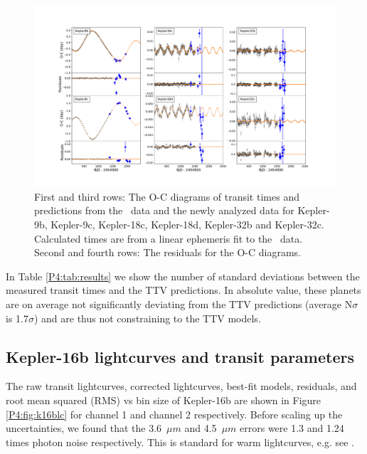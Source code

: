 \begin{figure}
    \centering
    \includegraphics[trim=110 70 110 90, clip, width = \textwidth]{TTVs.pdf}
    \caption{First and third rows: The O-C diagrams of transit times and predictions from the \Kepler~data and the newly analyzed \spitzer data for Kepler-9b, Kepler-9c, Kepler-18c, Kepler-18d, Kepler-32b and Kepler-32c. Calculated times are from a linear ephemeris fit to the \Kepler~data. Second and fourth rows: The residuals for the O-C diagrams.}
    \label{P4:fig:TTVs}
\end{figure}

In Table \ref{P4:tab:results} we show the number of standard deviations between the measured transit times and the TTV predictions. In absolute value, these planets are on average not significantly deviating from the TTV predictions (average N$\sigma$ is 1.7$\sigma$) and are thus not constraining to the TTV models.

\subsection{Kepler-16b lightcurves and transit parameters}

The raw transit lightcurves, corrected lightcurves, best-fit models, residuals, and root mean squared (RMS) vs bin size of Kepler-16b are shown in Figure \ref{P4:fig:k16blc} for channel 1 and channel 2 respectively. Before scaling up the uncertainties, we found that the 3.6~$\mu m$ and 4.5~$\mu m$ errors were 1.3 and 1.24 times photon noise respectively. This is standard for warm \spitzerIRAC lightcurves, e.g. see \citet{Baxter2021}.

